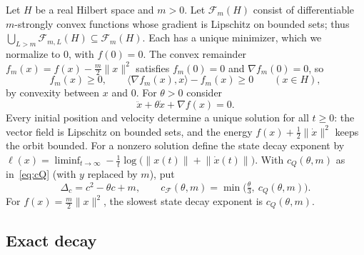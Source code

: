 \documentclass[11pt]{article}
\theoremstyle{definition}
\theoremstyle{remark}
\newcommand{\cF}{\mathcal F}
\newcommand{\ip}[2]{\langle #1,#2\rangle}
\newcommand{\norm}[1]{\lVert #1\rVert}
\newcommand{\cQ}{c_{Q}}
\newcommand{\cFF}{c_{\cF}}
\newcommand{\cFm}{\cF_m}
\begin{document}
Let \(H\) be a real Hilbert space and \(m>0\).  Let \(\cFm(H)\) consist of
differentiable \(m\)-strongly convex functions whose gradient is Lipschitz on
bounded sets; thus \(\bigcup_{L>m}\cF_{m,L}(H)\subseteq\cFm(H)\).
Each has a unique minimizer, which we normalize to \(0\), with \(f(0)=0\).
The convex remainder \(f_m(x)=f(x)-\frac m2\norm x^2\) satisfies
\(f_m(0)=0\) and \(\nabla f_m(0)=0\), so
\begin{equation}\label{eq:hineq}
f_m(x)\ge0,\qquad \ip{\nabla f_m(x)}x-f_m(x)\ge0\qquad(x\in H),
\end{equation}
by convexity between \(x\) and \(0\).  For \(\theta>0\) consider
\begin{equation}\label{eq:flow}
\ddot x+\theta\dot x+\nabla f(x)=0 .
\end{equation}
Every initial position and velocity determine a unique solution for all
\(t\ge0\): the vector field is Lipschitz on bounded sets, and the energy
\(f(x)+\frac12\norm{\dot x}^2\) keeps the orbit bounded.
For a nonzero solution define the state decay exponent by
\(\ell(x)=\liminf_{t\to\infty}-\frac1t\log\bigl(\norm{x(t)}+\norm{\dot x(t)}\bigr)\).
With \(\cQ(\theta,m)\) as in~\eqref{eq:cQ} (with \(y\) replaced by \(m\)), put
\begin{equation}\label{eq:cF}
\Delta_c=c^2-\theta c+m,\qquad \cFF(\theta,m)=\min\bigl(\tfrac\theta3,\ \cQ(\theta,m)\bigr).
\end{equation}
For \(f(x)=\frac m2\norm x^2\), the slowest state decay exponent is \(\cQ(\theta,m)\).

\subsection{Exact decay}
\end{document}
